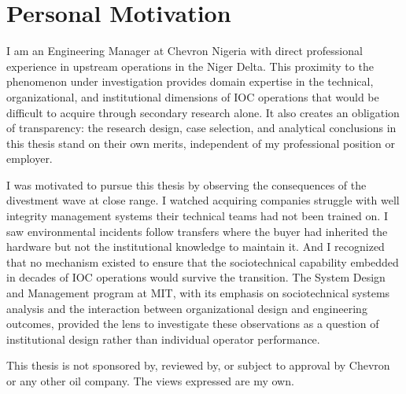 \hypertarget{personal-motivation}{%
\section{Personal Motivation}\label{personal-motivation}}

I am an Engineering Manager at Chevron Nigeria with direct professional
experience in upstream operations in the Niger Delta. This proximity to
the phenomenon under investigation provides domain expertise in the
technical, organizational, and institutional dimensions of IOC
operations that would be difficult to acquire through secondary research
alone. It also creates an obligation of transparency: the research
design, case selection, and analytical conclusions in this thesis stand
on their own merits, independent of my professional position or
employer.

I was motivated to pursue this thesis by observing the consequences of
the divestment wave at close range. I watched acquiring companies
struggle with well integrity management systems their technical teams
had not been trained on. I saw environmental incidents follow transfers
where the buyer had inherited the hardware but not the institutional
knowledge to maintain it. And I recognized that no mechanism existed to
ensure that the sociotechnical capability embedded in decades of IOC
operations would survive the transition. The System Design and
Management program at MIT, with its emphasis on sociotechnical systems
analysis and the interaction between organizational design and
engineering outcomes, provided the lens to investigate these
observations as a question of institutional design rather than
individual operator performance.

This thesis is not sponsored by, reviewed by, or subject to approval by
Chevron or any other oil company. The views expressed are my own.
